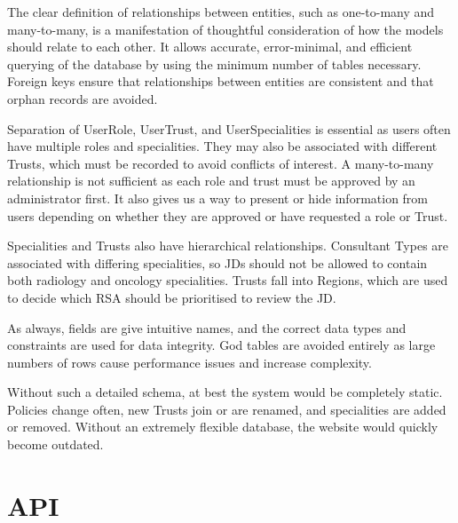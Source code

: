 The clear definition of relationships between entities, such as one-to-many and many-to-many, is a manifestation of thoughtful consideration of how the models should relate to each other. It allows accurate, error-minimal, and efficient querying of the database by using the minimum number of tables necessary. Foreign keys ensure that relationships between entities are consistent and that orphan records are avoided.

Separation of UserRole, UserTrust, and UserSpecialities is essential as users often have multiple roles and specialities. They may also be associated with different Trusts, which must be recorded to avoid conflicts of interest. A many-to-many relationship is not sufficient as each role and trust must be approved by an administrator first. It also gives us a way to present or hide information from users depending on whether they are approved or have requested a role or Trust.

Specialities and Trusts also have hierarchical relationships. Consultant Types are associated with differing specialities, so JDs should not be allowed to contain both radiology and oncology specialities. Trusts fall into Regions, which are used to decide which RSA should be prioritised to review the JD.

As always, fields are give intuitive names, and the correct data types and constraints are used for data integrity. God tables are avoided entirely as large numbers of rows cause performance issues and increase complexity.

Without such a detailed schema, at best the system would be completely static. Policies change often, new Trusts join or are renamed, and specialities are added or removed. Without an extremely flexible database, the website would quickly become outdated.

\section{API}
